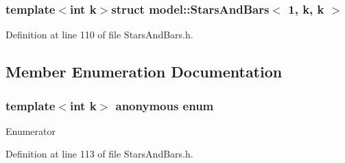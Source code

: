 \subsubsection*{template$<$int k$>$struct model\+::\+Stars\+And\+Bars$<$ 1, k, k $>$}



Definition at line 110 of file Stars\+And\+Bars.\+h.



\subsection{Member Enumeration Documentation}
\hypertarget{structmodel_1_1_stars_and_bars_3_011_00_01k_00_01k_01_4_a2ca2192ad0b99b7e6f12fbe7dfa337b8}{}\subsubsection[{anonymous enum}]{\setlength{\rightskip}{0pt plus 5cm}template$<$int k$>$ anonymous enum}\label{structmodel_1_1_stars_and_bars_3_011_00_01k_00_01k_01_4_a2ca2192ad0b99b7e6f12fbe7dfa337b8}
\begin{Desc}
\item[Enumerator]\par
\begin{description}
\item[{\em 
\hypertarget{structmodel_1_1_stars_and_bars_3_011_00_01k_00_01k_01_4_a2ca2192ad0b99b7e6f12fbe7dfa337b8a906fb6b5c95b61c15307eafdb059d503}{}N\label{structmodel_1_1_stars_and_bars_3_011_00_01k_00_01k_01_4_a2ca2192ad0b99b7e6f12fbe7dfa337b8a906fb6b5c95b61c15307eafdb059d503}
}]\end{description}
\end{Desc}


Definition at line 113 of file Stars\+And\+Bars.\+h.

